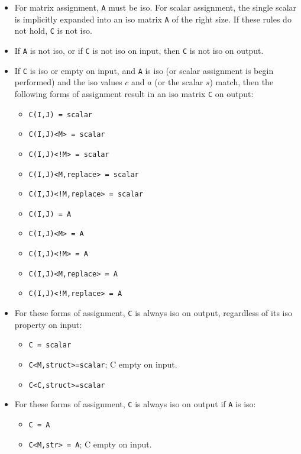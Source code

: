 \begin{itemize}
\item
For matrix assignment, \verb'A' must be iso.  For scalar assignment, the single
scalar is implicitly expanded into an iso matrix \verb'A' of the right size.
If these rules do not hold, \verb'C' is not iso.

\item
If \verb'A' is not iso, or if \verb'C' is not iso on input, then \verb'C' is
not iso on output.

\item
If \verb'C' is iso or empty on input, and \verb'A' is iso (or scalar assignment
is begin performed) and the iso values $c$ and $a$ (or the scalar $s$) match,
then the following forms of assignment result in an iso matrix \verb'C'  on
output:

                \begin{itemize}
                \item \verb'C(I,J) = scalar'
                \item \verb'C(I,J)<M> = scalar'
                \item \verb'C(I,J)<!M> = scalar'
                \item \verb'C(I,J)<M,replace> = scalar'
                \item \verb'C(I,J)<!M,replace> = scalar'
                \item \verb'C(I,J) = A'
                \item \verb'C(I,J)<M> = A'
                \item \verb'C(I,J)<!M> = A'
                \item \verb'C(I,J)<M,replace> = A'
                \item \verb'C(I,J)<!M,replace> = A'
                \end{itemize}

\item
For these forms of assignment, \verb'C' is always iso on output, regardless
of its iso property on input:

                \begin{itemize}
                \item \verb'C = scalar'
                \item \verb'C<M,struct>=scalar'; C empty on input.
                \item \verb'C<C,struct>=scalar'
                \end{itemize}

\item
For these forms of assignment, \verb'C' is always iso on output if \verb'A'
is iso:

                \begin{itemize}
                \item \verb'C = A'
                \item \verb'C<M,str> = A'; C empty on input.
                \end{itemize}
\end{itemize}


